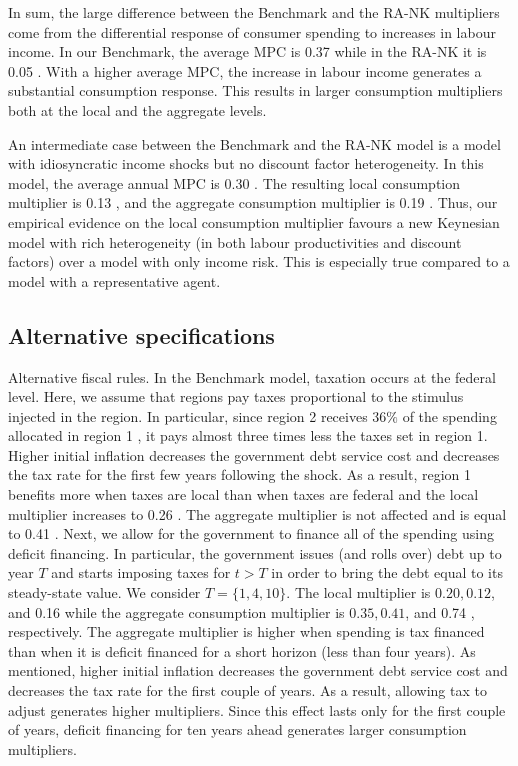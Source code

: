 \documentclass[\latexroot/\projectname]{subfiles}
\begin{document}
In sum, the large difference between the Benchmark and the RA-NK multipliers come from the differential response of consumer spending to increases in labour income. In our Benchmark, the average MPC is 0.37 while in the RA-NK it is 0.05 . With a higher average MPC, the increase in labour income generates a substantial consumption response. This results in larger consumption multipliers both at the local and the aggregate levels.

An intermediate case between the Benchmark and the RA-NK model is a model with idiosyncratic income shocks but no discount factor heterogeneity. In this model, the average annual MPC is 0.30 . The resulting local consumption multiplier is 0.13 , and the aggregate consumption multiplier is 0.19 . Thus, our empirical evidence on the local consumption multiplier favours a new Keynesian model with rich heterogeneity (in both labour productivities and discount factors) over a model with only income risk. This is especially true compared to a model with a representative agent.

\subsection{Alternative specifications}
Alternative fiscal rules. In the Benchmark model, taxation occurs at the federal level. Here, we assume that regions pay taxes proportional to the stimulus injected in the region. In particular, since region 2 receives $36 \%$ of the spending allocated in region 1 , it pays almost three times less the taxes set in region 1. Higher initial inflation decreases the government debt service cost and decreases the tax rate for the first few years following the shock. As a result, region 1 benefits more when taxes are local than when taxes are federal and the local multiplier increases to 0.26 . The aggregate multiplier is not affected and is equal to 0.41 . Next, we allow for the government to finance all of the spending using deficit financing. In particular, the government issues (and rolls over) debt up to year $T$ and starts imposing taxes for $t>T$ in order to bring the debt equal to its steady-state value. We consider $T=\{1,4,10\}$. The local multiplier is $0.20,0.12$, and 0.16 while the aggregate consumption multiplier is $0.35,0.41$, and 0.74 , respectively. The aggregate multiplier is higher when spending is tax financed than when it is deficit financed for a short horizon (less than four years). As mentioned, higher initial inflation decreases the government debt service cost and decreases the tax rate for the first couple of years. As a result, allowing tax to adjust generates higher multipliers. Since this effect lasts only for the first couple of years, deficit financing for ten years ahead generates larger consumption multipliers.
\end{document}
